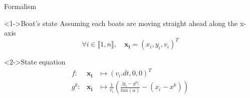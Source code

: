 \documentclass{beamer}
\begin{document}
        \begin{frame}{Formalism}
            \begin{block}<1->{Boat's state}
                Assuming each boats are moving straight ahead along the x-axis
                $$\forall i \in \llbracket 1, n\rrbracket, \quad \mathbf{x_i} = (x_i, y_i, v_i)^T$$ 
            \end{block}

            \begin{block}<2->{State equation}
                \begin{eqnarray}
                    f:& \mathbf{x_i} &\mapsto (v_i.dt, 0, 0)^T \\
                    g^k:& \mathbf{x_i}  &\mapsto \frac{1}{v_i} \left(\frac{\lvert y_i - y^k \rvert}{tan(\alpha)} - (x_i - x^k)\right)
                \end{eqnarray}
            \end{block}
        \end{frame}
\end{document}
